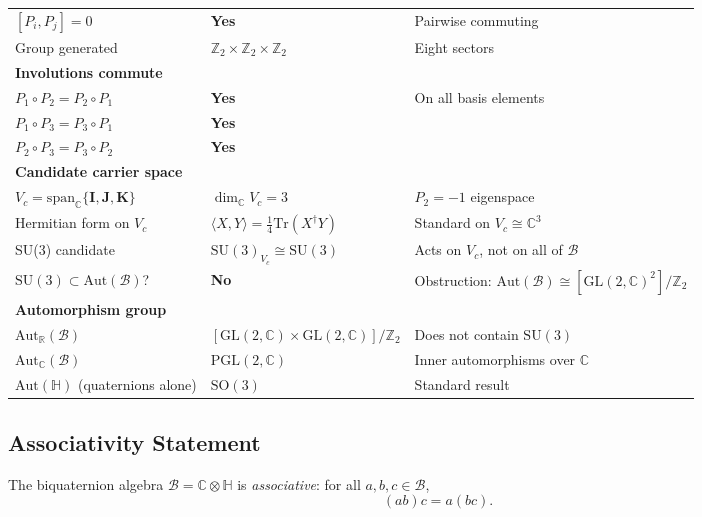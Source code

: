 \begin{table}[h]
\begin{tabular}{lll}
    $[P_i,P_j]=0$ & \textbf{Yes} & Pairwise commuting \\
    Group generated & $\mathbb{Z}_2\times\mathbb{Z}_2\times\mathbb{Z}_2$ & Eight sectors \\
    \hline
    \multicolumn{3}{l}{\textbf{Involutions commute}} \\
    $P_1\circ P_2 = P_2\circ P_1$ & \textbf{Yes} & On all basis elements \\
    $P_1\circ P_3 = P_3\circ P_1$ & \textbf{Yes} & \\
    $P_2\circ P_3 = P_3\circ P_2$ & \textbf{Yes} & \\
    \hline
    \multicolumn{3}{l}{\textbf{Candidate carrier space}} \\
    $V_c = \mathrm{span}_\mathbb{C}\{\mathbf{I},\mathbf{J},\mathbf{K}\}$ & $\dim_\mathbb{C}V_c = 3$ & $P_2=-1$ eigenspace \\
    Hermitian form on $V_c$ & $\langle X,Y\rangle = \tfrac{1}{4}\mathrm{Tr}(X^\dagger Y)$ & Standard on $V_c\cong\mathbb{C}^3$ \\
    SU(3) candidate & $\mathrm{SU}(3)_{V_c}\cong\mathrm{SU}(3)$ & Acts on $V_c$, not on all of $\mathcal{B}$ \\
    $\mathrm{SU}(3)\subset\mathrm{Aut}(\mathcal{B})$? & \textbf{No} & Obstruction: $\mathrm{Aut}(\mathcal{B})\cong[\mathrm{GL}(2,\mathbb{C})^2]/\mathbb{Z}_2$ \\
    \hline
    \multicolumn{3}{l}{\textbf{Automorphism group}} \\
    $\mathrm{Aut}_\mathbb{R}(\mathcal{B})$ & $[\mathrm{GL}(2,\mathbb{C})\times\mathrm{GL}(2,\mathbb{C})]/\mathbb{Z}_2$ & Does not contain $\mathrm{SU}(3)$ \\
    $\mathrm{Aut}_\mathbb{C}(\mathcal{B})$ & $\mathrm{PGL}(2,\mathbb{C})$ & Inner automorphisms over $\mathbb{C}$ \\
    $\mathrm{Aut}(\mathbb{H})$ (quaternions alone) & $\mathrm{SO}(3)$ & Standard result \\
    \hline
  \end{tabular}
\end{table}

\subsection{Associativity Statement}

\begin{proposition}
  \label{prop:B_associative}
  The biquaternion algebra $\mathcal{B}=\mathbb{C}\otimes\mathbb{H}$ is
  \emph{associative}: for all $a,b,c\in\mathcal{B}$,
  \begin{equation}
    (ab)c = a(bc).
  \end{equation}
\end{proposition}

